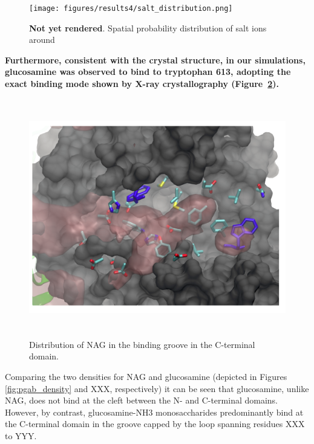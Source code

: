 \begin{figure}
\centering
\texttt{[image: figures/results4/salt\_distribution.png]}
\caption[Ionic distribution]{\textbf{Not yet rendered}. Spatial probability distribution of salt ions around \pgab}
\label{fig:salt_density_distribution}
\end{figure}

\textbf{Furthermore, consistent with the crystal structure, in our simulations, glucosamine was observed to bind to tryptophan 613, adopting the exact binding mode shown by X-ray crystallography (Figure~\ref{fig:nag_cterminal_zoomedin}).}

\begin{figure}
\centering
\includegraphics[height=4.1in, width=6.23in]{figures/results4/nag_cterminal_zoomedin.png}
\caption{Distribution of NAG in the binding groove in the C-terminal domain.}
\label{fig:nag_cterminal_zoomedin}
\end{figure}

Comparing the two densities for NAG and glucosamine (depicted in Figures \ref{fig:pgab_density} and XXX, respectively) it can be seen that glucosamine, unlike NAG, does not bind at the cleft between the N- and C-terminal domains. However, by contrast, glucosamine-NH3 monosaccharides predominantly bind at the C-terminal domain in the groove capped by the loop spanning residues XXX to YYY.  %

